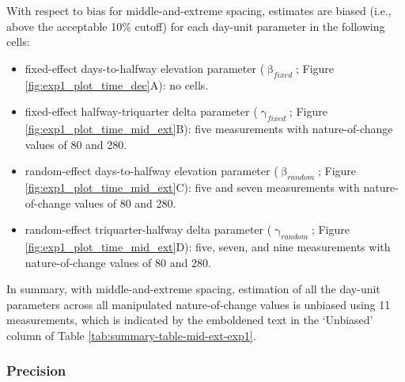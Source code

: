 \documentclass[
12pt, %
twoside,
english]{guelphthesis}
\theoremstyle{definition}
\theoremstyle{definition}
\theoremstyle{definition}
\theoremstyle{definition}
\theoremstyle{remark}
\begin{document}
With respect to bias for middle-and-extreme spacing, estimates are biased (i.e., above the acceptable 10\% cutoff) for each day-unit parameter in the following cells:
\begin{itemize}
\tightlist
\item
  fixed-effect days-to-halfway elevation parameter (\(\upbeta_{fixed}\); Figure \ref{fig:exp1_plot_time_dec}A): no cells.
\item
  fixed-effect halfway-triquarter delta parameter (\(\upgamma_{fixed}\); Figure \ref{fig:exp1_plot_time_mid_ext}B): five measurements with nature-of-change values of 80 and 280.
\item
  random-effect days-to-halfway elevation parameter (\(\upbeta_{random}\); Figure \ref{fig:exp1_plot_time_mid_ext}C): five and seven measurements with nature-of-change values of 80 and 280.
\item
  random-effect triquarter-halfway delta parameter (\(\upgamma_{random}\); Figure \ref{fig:exp1_plot_time_mid_ext}D): five, seven, and nine measurements with nature-of-change values of 80 and 280.
\end{itemize}
In summary, with middle-and-extreme spacing, estimation of all the day-unit parameters across all manipulated nature-of-change values is unbiased using 11 measurements, which is indicated by the emboldened text in the `Unbiased' column of Table \ref{tab:summary-table-mid-ext-exp1}.

\hypertarget{precision-mid-ext-exp1}{%
\subsubsection{Precision}\label{precision-mid-ext-exp1}}
\end{document}
